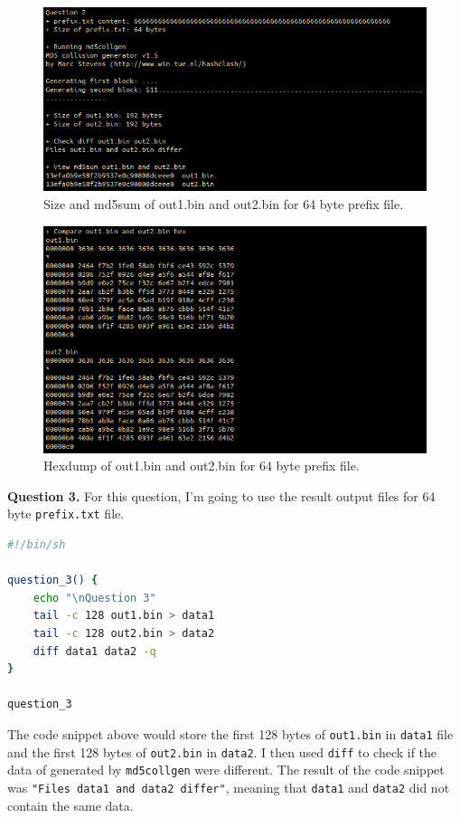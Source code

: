 \documentclass{article}
\begin{document}
\begin{figure}[!ht]
    \centering
    \includegraphics[scale=0.5]{task1.2.1.png}
    \caption{Size and md5sum of out1.bin and out2.bin for 64 byte prefix file.}
\end{figure}

\begin{figure}[!ht]
    \centering
    \includegraphics[scale=0.5]{task1.2.2.png}
    \caption{Hexdump of out1.bin and out2.bin for 64 byte prefix file.}
\end{figure}

\textbf{Question 3.} For this question, I'm going to use the result output files
for 64 byte \texttt{prefix.txt} file.

\begin{lstlisting}[language=bash]
#!/bin/sh

question_3() {
    echo "\nQuestion 3"
    tail -c 128 out1.bin > data1
    tail -c 128 out2.bin > data2
    diff data1 data2 -q
}

question_3
\end{lstlisting}

The code snippet above would store the first 128 bytes of \texttt{out1.bin} in
\texttt{data1} file and the first 128 bytes of \texttt{out2.bin} in \texttt{data2}.
I then used \texttt{diff} to check if the data of generated by \texttt{md5collgen}
were different. The result of the code snippet was \texttt{"Files data1 and data2 differ"},
meaning that \texttt{data1} and \texttt{data2} did not contain the same data.
\end{document}
